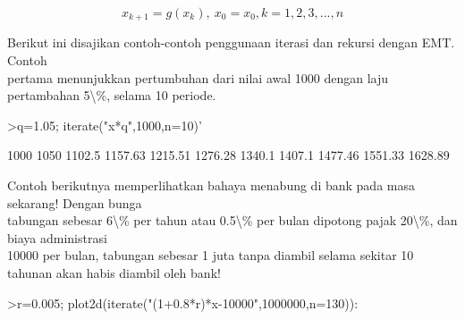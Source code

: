 \documentclass[12pt,Times new roman,letterpaper]{book}
\begin{document}
\begin{eulernootebook}
\begin{eulercomment}
\begin{eulercomment}
\begin{eulernootebook}
\begin{eulercomment}
\begin{eulercomment}
\begin{eulercomment}
\begin{eulercomment}
\begin{eulercomment}
\begin{eulercomment}
\begin{eulernotebook}
\begin{eulercomment}
\begin{eulercomment}
\begin{eulercomment}
\begin{eulercomment}
\begin{eulercomment}
\begin{eulercomment}
\begin{eulercomment}
\begin{eulercomment}
\begin{eulercomment}
\begin{eulercomment}
\begin{eulercomment}
\begin{eulercomment}
\begin{eulercomment}
\begin{eulercomment}
\begin{eulercomment}
\begin{eulercomment}
\begin{eulercomment}
\begin{eulercomment}
\begin{eulercomment}
\begin{eulercomment}
\begin{eulercomment}
\begin{eulercomment}
\begin{eulercomment}
\begin{eulercomment}
\begin{eulercomment}
\begin{eulercomment}
\begin{eulercomment}
\end{eulercomment}
\begin{eulerformula}
\[
x_{k+1}=g(x_k), \ x_0=x_0, k= 1, 2, 3, ..., n
\]
\end{eulerformula}
\begin{eulercomment}
Berikut ini disajikan contoh-contoh penggunaan iterasi dan rekursi
dengan EMT. Contoh\\
pertama menunjukkan pertumbuhan dari nilai awal 1000 dengan laju
pertambahan 5\textbackslash{}\%, selama 10 periode.
\end{eulercomment}
\begin{eulerprompt}
>q=1.05; iterate("x*q",1000,n=10)'
\end{eulerprompt}
\begin{euleroutput}
           1000 
           1050 
         1102.5 
        1157.63 
        1215.51 
        1276.28 
         1340.1 
         1407.1 
        1477.46 
        1551.33 
        1628.89 
\end{euleroutput}
\begin{eulercomment}
Contoh berikutnya memperlihatkan bahaya menabung di bank pada masa
sekarang! Dengan bunga\\
tabungan sebesar 6\textbackslash{}\% per tahun atau 0.5\textbackslash{}\% per bulan dipotong pajak
20\textbackslash{}\%, dan biaya administrasi\\
10000 per bulan, tabungan sebesar 1 juta tanpa diambil selama sekitar
10 tahunan akan habis diambil oleh bank!
\end{eulercomment}
\begin{eulerprompt}
>r=0.005; plot2d(iterate("(1+0.8*r)*x-10000",1000000,n=130)):
\end{eulerprompt}

\end{eulercomment}
\end{eulercomment}
\end{eulercomment}
\end{eulercomment}
\end{eulercomment}
\end{eulercomment}
\end{eulercomment}
\end{eulercomment}
\end{eulercomment}
\end{eulercomment}
\end{eulercomment}
\end{eulercomment}
\end{eulercomment}
\end{eulercomment}
\end{eulercomment}
\end{eulercomment}
\end{eulercomment}
\end{eulercomment}
\end{eulercomment}
\end{eulercomment}
\end{eulercomment}
\end{eulercomment}
\end{eulercomment}
\end{eulercomment}
\end{eulercomment}
\end{eulercomment}
\end{eulernotebook}
\end{eulercomment}
\end{eulercomment}
\end{eulercomment}
\end{eulercomment}
\end{eulercomment}
\end{eulercomment}
\end{eulernootebook}
\end{eulercomment}
\end{eulercomment}
\end{eulernootebook}
\end{document}
